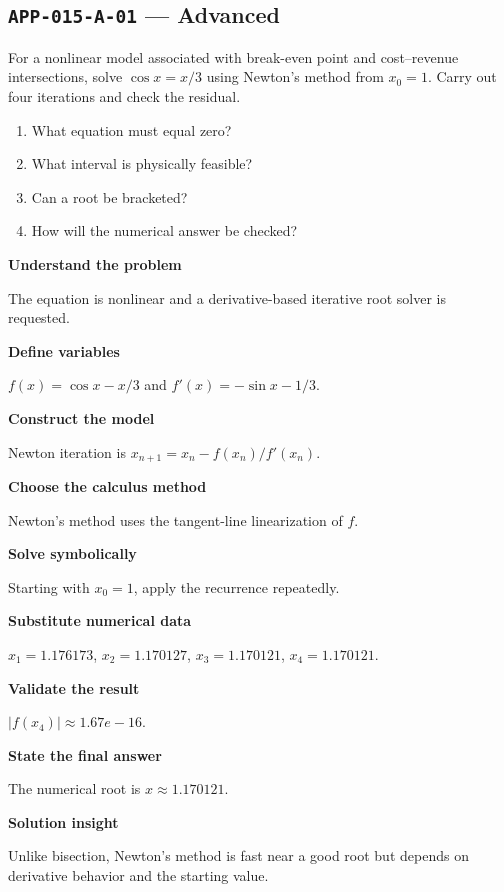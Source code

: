 \documentclass[11pt]{book}
\newcommand{\pid}[1]{\texttt{#1}}
\begin{document}
\subsection*{\pid{APP-015-A-01} — Advanced}
\begin{problembox}
For a nonlinear model associated with break-even point and cost–revenue intersections, solve $\cos x=x/3$ using Newton's method from $x_0=1$. Carry out four iterations and check the residual.
\end{problembox}
\begin{promptbox}\begin{enumerate}
\item What equation must equal zero?
\item What interval is physically feasible?
\item Can a root be bracketed?
\item How will the numerical answer be checked?
\end{enumerate}\end{promptbox}
\begin{solutionbox}
\textbf{Understand the problem}\par The equation is nonlinear and a derivative-based iterative root solver is requested.\par\medskip
\textbf{Define variables}\par $f(x)=\cos x-x/3$ and $f'(x)=-\sin x-1/3$.\par\medskip
\textbf{Construct the model}\par Newton iteration is $x_{n+1}=x_n-f(x_n)/f'(x_n)$.\par\medskip
\textbf{Choose the calculus method}\par Newton’s method uses the tangent-line linearization of $f$.\par\medskip
\textbf{Solve symbolically}\par Starting with $x_0=1$, apply the recurrence repeatedly.\par\medskip
\textbf{Substitute numerical data}\par $x_1=1.176173$, $x_2=1.170127$, $x_3=1.170121$, $x_4=1.170121$.\par\medskip
\textbf{Validate the result}\par $|f(x_4)|\approx 1.67e-16$.\par\medskip
\textbf{State the final answer}\par The numerical root is $x\approx 1.170121$.\par\medskip
\textbf{Solution insight}\par Unlike bisection, Newton’s method is fast near a good root but depends on derivative behavior and the starting value.\par\medskip
\end{solutionbox}
\end{document}
